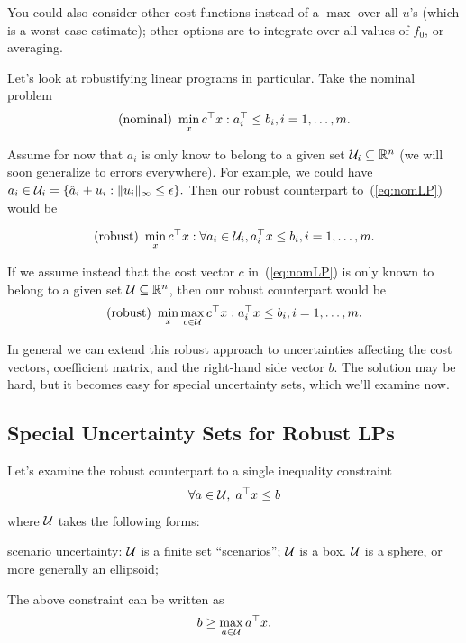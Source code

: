 \documentclass[11 pt]{scrartcl}
\begin{document}
You could also consider other cost functions instead of a $\max$ over all $u$'s (which is a worst-case estimate); other options are to integrate over all values of $f_0$, or averaging. 

Let's look at robustifying linear programs in particular. 
Take the nominal problem 
\begin{align}
\text{(nominal) }\min_x c^\top x : a_i^\top \leq b_i, i = 1, \dots, m.
\label{eq:nomLP}
\end{align}

Assume for now that $a_i$ is only know to belong to a given set $\mathcal U_i \subseteq \mathbb R^n$ (we will soon generalize to errors everywhere). 
For example, we could have $a_i \in \mathcal U_i = \{\hat{a}_i + u_i : \|u_i\|_\infty \leq \epsilon\}.$
Then our robust counterpart to~(\ref{eq:nomLP}) would be 

\[ \text{(robust) }\min_x c^\top x : \forall a_i\in \mathcal U_i, a_i^\top x \leq b_i, i = 1,\dots, m.\] 

If we assume instead that the cost vector $c$ in~(\ref{eq:nomLP}) is only known to belong to a given set $\mathcal U \subseteq \mathbb R^n$, then our robust counterpart would be 
\[ \text{(robust) }\min_x \max_{c\in\mathcal U} c^\top x : a_i^\top x \leq b_i, i = 1,\dots, m.\] 

In general we can extend this robust approach to uncertainties affecting the cost vectors, coefficient matrix, and the right-hand side vector $b$. 
The solution may be hard, but it becomes easy for special uncertainty sets, which we'll examine now. 

\subsection{Special Uncertainty Sets for Robust LPs}
Let's examine the robust counterpart to a single inequality constraint 
\[ \forall a\in \mathcal U,\; a^\top x \leq b\]
where $\mathcal U$ takes the following forms: 
\begin{itemize}
    \ii scenario uncertainty: $\mathcal U$ is a finite set ``scenarios''; 
    \ii $\mathcal U$ is a box.
    \ii $\mathcal U$ is a sphere, or more generally an ellipsoid; 
\end{itemize}

The above constraint can be written as 
\[ b \geq \max_{a\in \mathcal U} a^\top x.\] 
\end{document}
